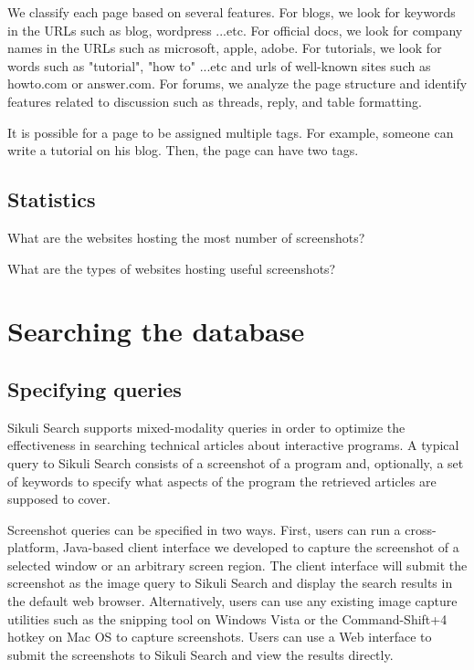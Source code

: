\documentclass{www2010-submission}
\begin{document}
We classify each page based on several features. For blogs, we
look for keywords in the URLs such as blog, wordpress ...etc. For
official docs, we look for company names in the URLs such as
microsoft, apple, adobe. For tutorials, we look for words such as
"tutorial", "how to" ...etc and urls of well-known sites such as
howto.com or answer.com. For forums, we analyze the page structure
and identify features related to discussion such as threads,
reply, and table formatting.

It is possible for a page to be assigned multiple tags. For
example, someone can write a tutorial on his blog. Then, the page
can have two tags.

\subsection{Statistics}

What are the websites hosting the most number of screenshots?

What are the types of websites hosting useful screenshots?


\section{Searching the database}

\subsection{Specifying queries}

Sikuli Search supports mixed-modality queries in order to optimize
the effectiveness in searching technical articles about
interactive programs. A typical query to Sikuli Search consists of
a screenshot of a program and, optionally, a set of keywords to
specify what aspects of the program the retrieved articles are
supposed to cover.

Screenshot queries can be specified in two ways. First, users can
run a cross-platform, Java-based client interface we developed to
capture the screenshot of a selected window or an arbitrary screen
region. The client interface will submit the screenshot as the
image query to Sikuli Search and display the search results in the
default web browser. Alternatively, users can use any existing
image capture utilities such as the snipping tool on Windows Vista
or the Command-Shift+4 hotkey on Mac OS to capture screenshots.
Users can use a Web interface to submit the screenshots to Sikuli
Search and view the results directly.
\end{document}
